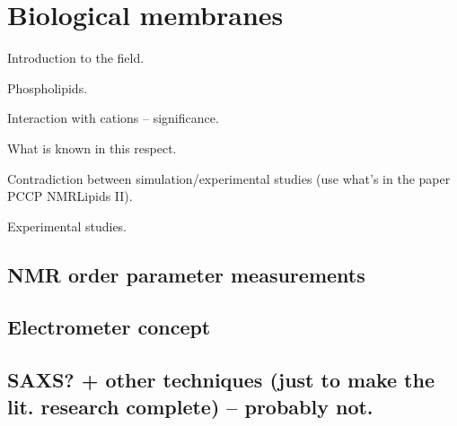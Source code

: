 \chapter{Biological membranes}

 Introduction to the field. 
 \cite{Student08}

 Phospholipids. 

 Interaction with cations -- significance. 

 What is known in this respect. 

 Contradiction between simulation/experimental studies 
(use what's in the paper PCCP NMRLipids II). 

Experimental studies. 

\section{NMR order parameter measurements}

\section{Electrometer concept}

\section{SAXS? + other techniques (just to make the lit. research complete) -- probably not.}

